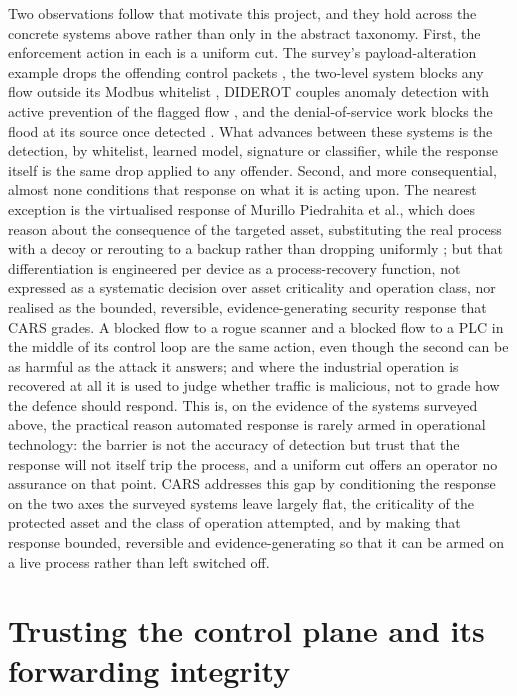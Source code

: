 Two observations follow that motivate this project, and they hold across the concrete systems above rather than only in the abstract taxonomy. First, the enforcement action in each is a uniform cut. The survey's payload-alteration example drops the offending control packets \cite{etxezarreta2023survey}, the two-level system blocks any flow outside its Modbus whitelist \cite{kabasele2018twolevel}, DIDEROT couples anomaly detection with active prevention of the flagged flow \cite{radoglou2020diderot}, and the denial-of-service work blocks the flood at its source once detected \cite{manso2019ddos, oyucu2024ensemble}. What advances between these systems is the detection, by whitelist, learned model, signature or classifier, while the response itself is the same drop applied to any offender. Second, and more consequential, almost none conditions that response on what it is acting upon. The nearest exception is the virtualised response of Murillo Piedrahita et al., which does reason about the consequence of the targeted asset, substituting the real process with a decoy or rerouting to a backup rather than dropping uniformly \cite{murillo2018virf}; but that differentiation is engineered per device as a process-recovery function, not expressed as a systematic decision over asset criticality and operation class, nor realised as the bounded, reversible, evidence-generating security response that CARS grades. A blocked flow to a rogue scanner and a blocked flow to a PLC in the middle of its control loop are the same action, even though the second can be as harmful as the attack it answers; and where the industrial operation is recovered at all it is used to judge whether traffic is malicious, not to grade how the defence should respond. This is, on the evidence of the systems surveyed above, the practical reason automated response is rarely armed in operational technology: the barrier is not the accuracy of detection but trust that the response will not itself trip the process, and a uniform cut offers an operator no assurance on that point. CARS addresses this gap by conditioning the response on the two axes the surveyed systems leave largely flat, the criticality of the protected asset and the class of operation attempted, and by making that response bounded, reversible and evidence-generating so that it can be armed on a live process rather than left switched off.

\section{Trusting the control plane and its forwarding integrity}
\label{sec:controlplane}

